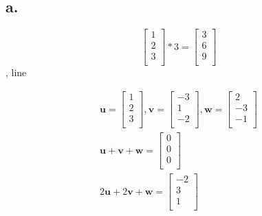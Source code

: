 \documentclass{report}
\begin{document}
\sol

\subsection*{ a. }

\[
    \begin{bmatrix}
        1\\
        2\\
        3\\
    \end{bmatrix}
    * 3 =
    \begin{bmatrix}
        3\\
        6\\
        9\\
    \end{bmatrix}
\]
, line

\begin{question}{5}{}

\end{question}

\sol

\begin{gather*}
    \mathbf{u} =
    \begin{bmatrix}
        1\\
        2\\
        3\\
    \end{bmatrix},
    \mathbf{v} =
    \begin{bmatrix}
        -3\\
        1\\
        -2\\
    \end{bmatrix},
    \mathbf{w} =
    \begin{bmatrix}
        2\\
        -3\\
        -1\\
    \end{bmatrix} \\
    \mathbf{u} + \mathbf{v} + \mathbf{w} =
    \begin{bmatrix}
        0\\
        0\\
        0\\
    \end{bmatrix} \\
    2\mathbf{u} + 2\mathbf{v} + \mathbf{w} =
    \begin{bmatrix}
        -2\\
        3\\
        1\\
    \end{bmatrix}
\end{gather*}
\end{document}
